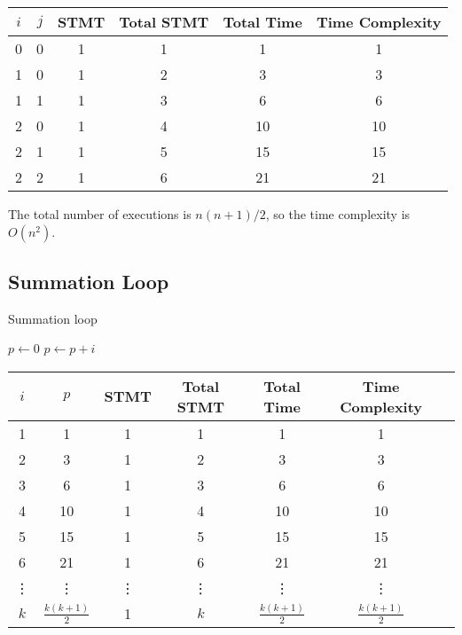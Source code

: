 \documentclass[twoside]{article}
\begin{document}
\begin{table}[H]
    \centering
    \begin{tabular}{|c|c|c|c|c|c|}
        \hline
        $i$ & $j$ & STMT & Total STMT & Total Time & Time Complexity \\
        \hline
        0 & 0 & 1 & 1 & 1 & 1 \\
        1 & 0 & 1 & 2 & 3 & 3 \\
        1 & 1 & 1 & 3 & 6 & 6 \\
        2 & 0 & 1 & 4 & 10 & 10 \\
        2 & 1 & 1 & 5 & 15 & 15 \\
        2 & 2 & 1 & 6 & 21 & 21 \\
        \hline
    \end{tabular}
\end{table}

The total number of executions is $n(n+1)/2$, so the time complexity is $O(n^2)$.

\subsection{Summation Loop}
\begin{algorithm}[H]
    \caption{Summation loop}\label{simple_for5}
    \begin{algorithmic}
        \State $p \gets 0$
            \State $p \gets p + i$
        \EndFor
    \end{algorithmic}
\end{algorithm}

\begin{table}[H]
    \centering
    \begin{tabular}{|c|c|c|c|c|c|c|}
        \hline
        $i$ & $p$ & STMT & Total STMT & Total Time & Time Complexity \\
        \hline
        1 & 1 & 1 & 1 & 1 & 1 \\
        2 & 3 & 1 & 2 & 3 & 3 \\
        3 & 6 & 1 & 3 & 6 & 6 \\
        4 & 10 & 1 & 4 & 10 & 10 \\
        5 & 15 & 1 & 5 & 15 & 15 \\
        6 & 21 & 1 & 6 & 21 & 21 \\
        \vdots & \vdots & \vdots & \vdots & \vdots & \vdots \\
        $k$ & $\frac{k(k+1)}{2}$ & 1 & $k$ & $\frac{k(k+1)}{2}$ & $\frac{k(k+1)}{2}$ \\
        \hline
    \end{tabular}
\end{table}
\end{document}
